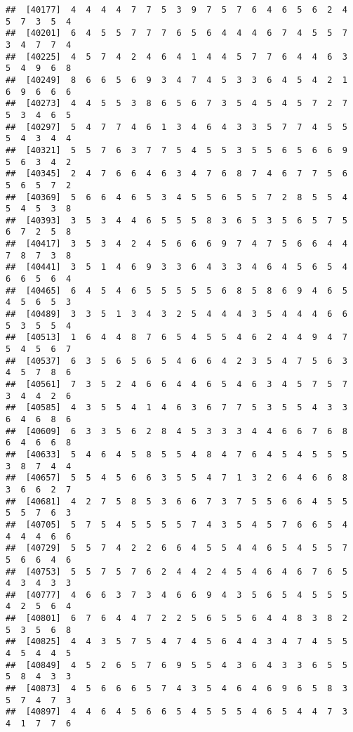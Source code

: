 \documentclass[
]{book}
\begin{document}
\begin{verbatim}
##  [40177]  4  4  4  4  7  7  5  3  9  7  5  7  6  4  6  5  6  2  4  5  7  3  5  4
##  [40201]  6  4  5  5  7  7  7  6  5  6  4  4  4  6  7  4  5  5  7  3  4  7  7  4
##  [40225]  4  5  7  4  2  4  6  4  1  4  4  5  7  7  6  4  4  6  3  5  4  9  6  8
##  [40249]  8  6  6  5  6  9  3  4  7  4  5  3  3  6  4  5  4  2  1  6  9  6  6  6
##  [40273]  4  4  5  5  3  8  6  5  6  7  3  5  4  5  4  5  7  2  7  5  3  4  6  5
##  [40297]  5  4  7  7  4  6  1  3  4  6  4  3  3  5  7  7  4  5  5  5  4  3  4  4
##  [40321]  5  5  7  6  3  7  7  5  4  5  5  3  5  5  6  5  6  6  9  5  6  3  4  2
##  [40345]  2  4  7  6  6  4  6  3  4  7  6  8  7  4  6  7  7  5  6  5  6  5  7  2
##  [40369]  5  6  6  4  6  5  3  4  5  5  6  5  5  7  2  8  5  5  4  5  4  5  3  8
##  [40393]  3  5  3  4  4  6  5  5  5  8  3  6  5  3  5  6  5  7  5  6  7  2  5  8
##  [40417]  3  5  3  4  2  4  5  6  6  6  9  7  4  7  5  6  6  4  4  7  8  7  3  8
##  [40441]  3  5  1  4  6  9  3  3  6  4  3  3  4  6  4  5  6  5  4  6  6  5  6  4
##  [40465]  6  4  5  4  6  5  5  5  5  5  6  8  5  8  6  9  4  6  5  4  5  6  5  3
##  [40489]  3  3  5  1  3  4  3  2  5  4  4  4  3  5  4  4  4  6  6  5  3  5  5  4
##  [40513]  1  6  4  4  8  7  6  5  4  5  5  4  6  2  4  4  9  4  7  5  4  5  6  7
##  [40537]  6  3  5  6  5  6  5  4  6  6  4  2  3  5  4  7  5  6  3  4  5  7  8  6
##  [40561]  7  3  5  2  4  6  6  4  4  6  5  4  6  3  4  5  7  5  7  3  4  4  2  6
##  [40585]  4  3  5  5  4  1  4  6  3  6  7  7  5  3  5  5  4  3  3  6  4  6  8  6
##  [40609]  6  3  3  5  6  2  8  4  5  3  3  3  4  4  6  6  7  6  8  6  4  6  6  8
##  [40633]  5  4  6  4  5  8  5  5  4  8  4  7  6  4  5  4  5  5  5  3  8  7  4  4
##  [40657]  5  5  4  5  6  6  3  5  5  4  7  1  3  2  6  4  6  6  8  3  6  6  2  7
##  [40681]  4  2  7  5  8  5  3  6  6  7  3  7  5  5  6  6  4  5  5  5  5  7  6  3
##  [40705]  5  7  5  4  5  5  5  5  7  4  3  5  4  5  7  6  6  5  4  4  4  4  6  6
##  [40729]  5  5  7  4  2  2  6  6  4  5  5  4  4  6  5  4  5  5  7  5  6  6  4  6
##  [40753]  5  5  7  5  7  6  2  4  4  2  4  5  4  6  4  6  7  6  5  4  3  4  3  3
##  [40777]  4  6  6  3  7  3  4  6  6  9  4  3  5  6  5  4  5  5  5  4  2  5  6  4
##  [40801]  6  7  6  4  4  7  2  2  5  6  5  5  6  4  4  8  3  8  2  5  3  5  6  8
##  [40825]  4  4  3  5  7  5  4  7  4  5  6  4  4  3  4  7  4  5  5  4  5  4  4  5
##  [40849]  4  5  2  6  5  7  6  9  5  5  4  3  6  4  3  3  6  5  5  5  8  4  3  3
##  [40873]  4  5  6  6  6  5  7  4  3  5  4  6  4  6  9  6  5  8  3  5  7  4  7  3
##  [40897]  4  4  6  4  5  6  6  5  4  5  5  5  4  6  5  4  4  7  3  4  1  7  7  6

\end{verbatim}
\end{document}
